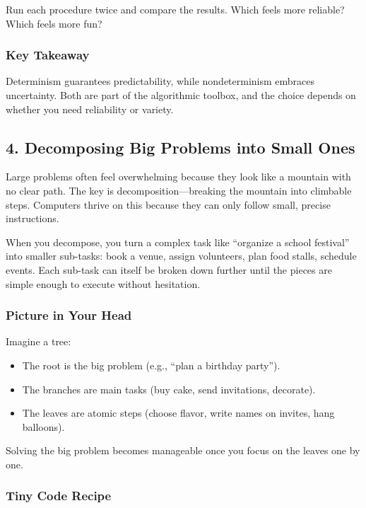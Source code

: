 \documentclass[
  letterpaper,
  DIV=11,
  numbers=noendperiod]{scrreprt}
\providecommand{\tightlist}{%
  \setlength{\itemsep}{0pt}\setlength{\parskip}{0pt}}
\begin{document}
Run each procedure twice and compare the results. Which feels more
reliable? Which feels more fun?

\subsubsection{Key Takeaway}\label{key-takeaway-1}

Determinism guarantees predictability, while nondeterminism embraces
uncertainty. Both are part of the algorithmic toolbox, and the choice
depends on whether you need reliability or variety.

\subsection{4. Decomposing Big Problems into Small
Ones}\label{decomposing-big-problems-into-small-ones}

Large problems often feel overwhelming because they look like a mountain
with no clear path. The key is decomposition---breaking the mountain
into climbable steps. Computers thrive on this because they can only
follow small, precise instructions.

When you decompose, you turn a complex task like ``organize a school
festival'' into smaller sub-tasks: book a venue, assign volunteers, plan
food stalls, schedule events. Each sub-task can itself be broken down
further until the pieces are simple enough to execute without
hesitation.

\subsubsection{Picture in Your Head}\label{picture-in-your-head-3}

Imagine a tree:

\begin{itemize}
\tightlist
\item
  The root is the big problem (e.g., ``plan a birthday party'').
\item
  The branches are main tasks (buy cake, send invitations, decorate).
\item
  The leaves are atomic steps (choose flavor, write names on invites,
  hang balloons).
\end{itemize}

Solving the big problem becomes manageable once you focus on the leaves
one by one.

\subsubsection{Tiny Code Recipe}\label{tiny-code-recipe-3}
\end{document}

